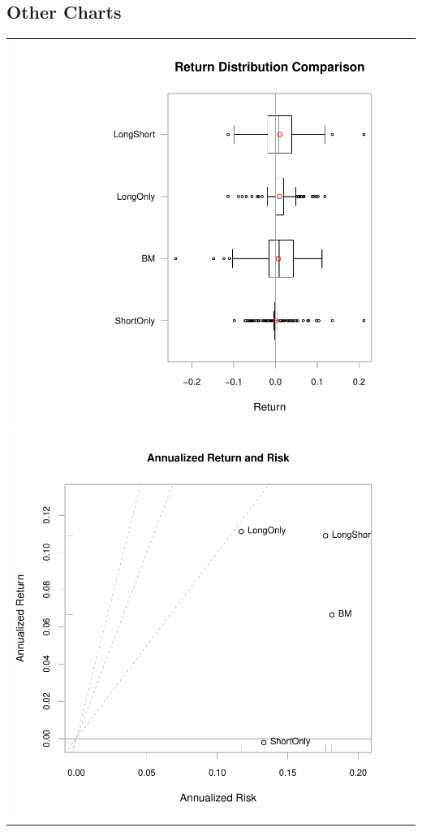 \documentclass{article}
\begin{document}
\subsection{Other Charts}
\begin{tabular}{cc}
\includegraphics{graphics/plot-008}
\includegraphics{graphics/plot-009}
\end{tabular}
\end{document}
